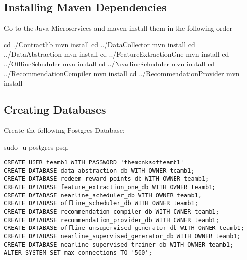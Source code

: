 \documentclass[
]{article}
\newenvironment{Shaded}{}{}
\newcommand{\BuiltInTok}[1]{#1}
\newcommand{\ExtensionTok}[1]{#1}
\newcommand{\FunctionTok}[1]{\textcolor[rgb]{0.02,0.16,0.49}{#1}}
\newcommand{\NormalTok}[1]{#1}
\begin{document}
\hypertarget{installing-maven-dependencies}{%
\subsection{Installing Maven
Dependencies}\label{installing-maven-dependencies}}

Go to the Java Microservices and maven install them in the following
order

\begin{Shaded}
\begin{Highlighting}[]
\BuiltInTok{cd}\NormalTok{ ./Contractlib}
\ExtensionTok{mvn}\NormalTok{ install}
\BuiltInTok{cd}\NormalTok{ ../DataCollector}
\ExtensionTok{mvn}\NormalTok{ install}
\BuiltInTok{cd}\NormalTok{ ../DataAbstraction}
\ExtensionTok{mvn}\NormalTok{ install}
\BuiltInTok{cd}\NormalTok{ ../FeatureExtractionOne}
\ExtensionTok{mvn}\NormalTok{ install}
\BuiltInTok{cd}\NormalTok{ ../OfflineScheduler}
\ExtensionTok{mvn}\NormalTok{ install}
\BuiltInTok{cd}\NormalTok{ ../NearlineScheduler}
\ExtensionTok{mvn}\NormalTok{ install}
\BuiltInTok{cd}\NormalTok{ ../RecommendationCompiler}
\ExtensionTok{mvn}\NormalTok{ install}
\BuiltInTok{cd}\NormalTok{ ../RecommendationProvider}
\ExtensionTok{mvn}\NormalTok{ install}
\end{Highlighting}
\end{Shaded}

\hypertarget{creating-databases}{%
\subsection{Creating Databases}\label{creating-databases}}

Create the following Postgres Database:

\begin{Shaded}
\begin{Highlighting}[]
\FunctionTok{sudo}\NormalTok{ {-}u postgres psql}
\end{Highlighting}
\end{Shaded}

\begin{verbatim}
CREATE USER teamb1 WITH PASSWORD 'themonksofteamb1'
CREATE DATABASE data_abstraction_db WITH OWNER teamb1;
CREATE DATABASE redeem_reward_points_db WITH OWNER teamb1;
CREATE DATABASE feature_extraction_one_db WITH OWNER teamb1;
CREATE DATABASE nearline_scheduler_db WITH OWNER teamb1;
CREATE DATABASE offline_scheduler_db WITH OWNER teamb1;
CREATE DATABASE recommendation_compiler_db WITH OWNER teamb1;
CREATE DATABASE recommendation_provider_db WITH OWNER teamb1;
CREATE DATABASE offline_unsupervised_generator_db WITH OWNER teamb1;
CREATE DATABASE nearline_supervised_generator_db WITH OWNER teamb1;
CREATE DATABASE nearline_supervised_trainer_db WITH OWNER teamb1;
ALTER SYSTEM SET max_connections TO '500';
\end{verbatim}
\end{document}
